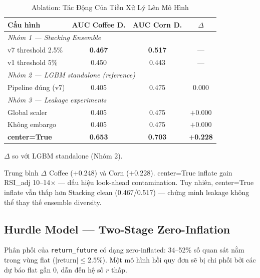 \documentclass[conference]{IEEEtran}
\begin{document}
\begin{table}[t]
\caption{Ablation: Tác Động Của Tiền Xử Lý Lên Mô Hình}
\label{tab:ablation}
\centering
\begin{threeparttable}
\begin{tabular}{@{}lccc@{}}
\toprule
\textbf{Cấu hình} & \textbf{AUC Coffee D.} & \textbf{AUC Corn D.} & \textbf{$\Delta$\tnote{a}} \\
\midrule
\multicolumn{4}{l}{\textit{Nhóm 1 — Stacking Ensemble}} \\
v7 threshold 2.5\%  & \textbf{0.467} & \textbf{0.517} & --- \\
v1 threshold 5\%    & 0.450          & 0.443          & --- \\
\midrule
\multicolumn{4}{l}{\textit{Nhóm 2 — LGBM standalone (reference)}} \\
Pipeline đúng (v7)  & 0.405          & 0.475          & 0.000 \\
\midrule
\multicolumn{4}{l}{\textit{Nhóm 3 — Leakage experiments}} \\
Global scaler       & 0.405 & 0.475 & $+$0.000 \\
Không embargo       & 0.405 & 0.475 & $+$0.000 \\
\textbf{center=True}& \textbf{0.653} & \textbf{0.703} & $+$\textbf{0.228}\tnote{b} \\
\bottomrule
\end{tabular}
\begin{tablenotes}
\footnotesize
\item[a] $\Delta$ so với LGBM standalone (Nhóm 2).
\item[b] Trung bình $\Delta$ Coffee ($+$0.248) và Corn ($+$0.228). center=True
inflate gain RSI\_adj 10--14$\times$ — dấu hiệu look-ahead contamination.
Tuy nhiên, center=True inflate vẫn thấp hơn Stacking clean (0.467/0.517)
— chứng minh leakage không thể thay thế ensemble diversity.
\end{tablenotes}
\end{threeparttable}
\end{table}

\subsection{Hurdle Model --- Two-Stage Zero-Inflation}

Phân phối của \texttt{return\_future} có dạng zero-inflated: 34--52\% số quan
sát nằm trong vùng flat ($|\text{return}| \leq 2.5\%$). Một mô hình hồi quy
đơn sẽ bị chi phối bởi các dự báo flat gần 0, dẫn đến hệ số $r$ thấp.
\end{document}
